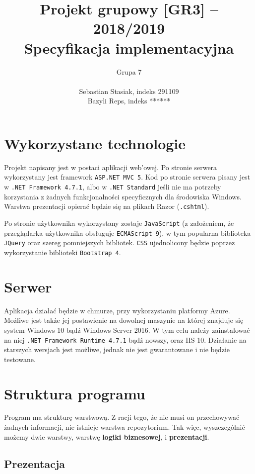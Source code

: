 \documentclass[a4paper, 10pt, titlepage]{article}
\title {Projekt grupowy [GR3] -- 2018/2019\\Specyfikacja implementacyjna}
\author{Grupa 7 \\\\ Sebastian Stasiak, indeks 291109 \\ Bazyli Reps, indeks ******}
\newcommand{\code}[1]{\texttt{#1}}
\begin{document}
\maketitle
\tableofcontents
\newpage

\section{Wykorzystane technologie}

Projekt napisany jest w postaci aplikacji web'owej.
Po stronie serwera wykorzystany jest framework \code{ASP.NET MVC 5}. Kod po stronie serwera pisany jest w \code{.NET Framework 4.7.1}, albo w \code{.NET Standard} jeśli nie ma potrzeby korzystania z żadnych funkcjonalności specyficznych dla środowiska Windows.
Warstwa prezentacji opierać będzie się na plikach Razor (\code{.cshtml}).

Po stronie użytkownika wykorzystany zostaje \code{JavaScript} (z założeniem, że przeglądarka użytkownika obsługuje \code{ECMAScript 9}), w tym popularna biblioteka \code{JQuery} oraz szereg pomniejszych bibliotek.
\code{CSS} ujednolicony będzie poprzez wykorzystanie biblioteki \code{Bootstrap 4}.

\section{Serwer}

Aplikacja działać będzie w chmurze, przy wykorzystaniu platformy Azure.
Możliwe jest także jej postawienie na dowolnej maszynie na której znajduje się system Windows 10 bądź Windows Server 2016.
W tym celu należy zainstalować na niej \code{.NET Framework Runtime 4.7.1} bądź nowszy, oraz IIS 10.
Działanie na starszych wersjach jest możliwe, jednak nie jest gwarantowane i nie będzie testowane.

\section{Struktura programu}

Program ma strukturę warstwową. Z racji tego, że nie musi on przechowywać żadnych informacji, nie istnieje warstwa repozytorium. Tak więc, wyszczególnić możemy dwie warstwy, warstwę \textbf{logiki biznesowej}, i \textbf{prezentacji}.

\subsection{Prezentacja}
\end{document}
